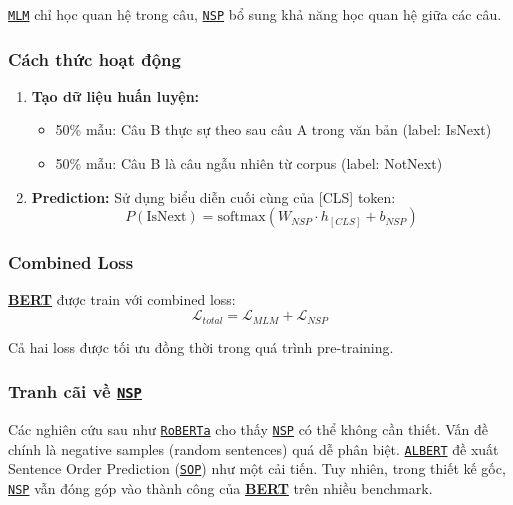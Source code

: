\hyperref[acro:mlm]{\texttt{MLM}} chỉ học quan hệ trong câu, \hyperref[acro:nsp]{\texttt{NSP}} bổ sung khả năng học quan hệ giữa các câu.

\subsubsection{Cách thức hoạt động}
\begin{enumerate}
    \item \textbf{Tạo dữ liệu huấn luyện:}
    \begin{itemize}
        \item 50\% mẫu: Câu B thực sự theo sau câu A trong văn bản (label: IsNext)
        \item 50\% mẫu: Câu B là câu ngẫu nhiên từ corpus (label: NotNext)
    \end{itemize}
    
    \item \textbf{Prediction:} Sử dụng biểu diễn cuối cùng của [CLS] token:
    \begin{equation}
    P(\text{IsNext}) = \text{softmax}(W_{NSP} \cdot h_{[CLS]} + b_{NSP})
    \label{eq:nsp_prediction}
    \end{equation}
\end{enumerate}

\subsubsection{Combined Loss}
\hyperref[acro:bert]{\textbf{BERT}} được train với combined loss:
\begin{equation}
\mathcal{L}_{total} = \mathcal{L}_{MLM} + \mathcal{L}_{NSP}
\label{eq:combined_loss}
\end{equation}

Cả hai loss được tối ưu đồng thời trong quá trình pre-training.

\subsubsection{Tranh cãi về \hyperref[acro:nsp]{\texttt{NSP}}}
Các nghiên cứu sau như \hyperref[acro:roberta]{\texttt{RoBERTa}} \cite{liu2019roberta} cho thấy \hyperref[acro:nsp]{\texttt{NSP}} có thể không cần thiết. Vấn đề chính là negative samples (random sentences) quá dễ phân biệt. \hyperref[acro:albert]{\texttt{ALBERT}} \cite{lan2019albert} đề xuất Sentence Order Prediction (\hyperref[acro:sop]{\texttt{SOP}}) như một cải tiến. Tuy nhiên, trong thiết kế gốc, \hyperref[acro:nsp]{\texttt{NSP}} vẫn đóng góp vào thành công của \hyperref[acro:bert]{\textbf{BERT}} trên nhiều benchmark.

